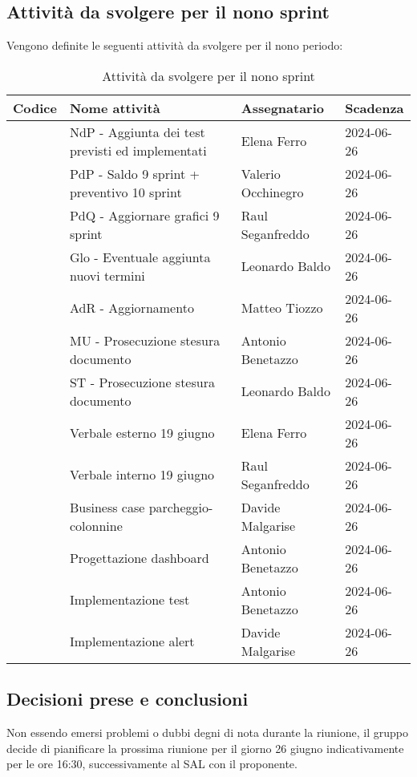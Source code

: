\documentclass[italian,12pt]{article}
\begin{document}
\subsection{Attività da svolgere per il nono sprint}
Vengono definite le seguenti attività da svolgere per il nono periodo:
\begin{table}[!h]
	\centering
	\begin{tabular}{ |l||p{7cm}|l|l| }
		\hline
		\textbf{Codice}          & \textbf{Nome attività}                           & \textbf{Assegnatario} & \textbf{Scadenza} \\
		\hline
		\mySkip[86bz8e28m]       & NdP - Aggiunta dei test previsti ed implementati & Elena Ferro           & 2024-06-26        \\
		\mySkip[86bz8e6cp]       & PdP - Saldo 9 sprint + preventivo 10 sprint      & Valerio Occhinegro    & 2024-06-26        \\
		\mySkip[86bz8e4ac]       & PdQ - Aggiornare grafici 9 sprint                & Raul Seganfreddo      & 2024-06-26        \\
		\mySkip[86bz8e8g5]       & Glo - Eventuale aggiunta nuovi termini           & Leonardo Baldo        & 2024-06-26        \\
		\mySkip[86bz8e13d]       & AdR - Aggiornamento                              & Matteo Tiozzo         & 2024-06-26        \\
		\mySkip[86bz8e2ja]       & MU - Prosecuzione stesura documento              & Antonio Benetazzo     & 2024-06-26        \\
		\mySkip[86bz8e3xn]       & ST - Prosecuzione stesura documento              & Leonardo Baldo        & 2024-06-26        \\
		\mySkip[86bz9gj8r]       & Verbale esterno 19 giugno                        & Elena Ferro           & 2024-06-26        \\
		\mySkip[86bz9gjd9]       & Verbale interno 19 giugno                        & Raul Seganfreddo      & 2024-06-26        \\
		\mySkip[86bz8dzy0]       & Business case parcheggio-colonnine               & Davide Malgarise      & 2024-06-26        \\
		\mySkip[86bz8dzz7]       & Progettazione dashboard                          & Antonio Benetazzo     & 2024-06-26        \\
		\mySkip[86bz8dzzg]       & Implementazione test                             & Antonio Benetazzo     & 2024-06-26        \\
		\mySkip[86bz8e010]       & Implementazione alert                            & Davide Malgarise      & 2024-06-26        \\
		\hline
	\end{tabular}
	\caption{Attività da svolgere per il nono sprint}
\end{table}

\subsection{Decisioni prese e conclusioni}
Non essendo emersi problemi o dubbi degni di nota durante la riunione, il gruppo decide di pianificare la prossima riunione per il giorno 26 giugno indicativamente per le ore 16:30, successivamente al SAL con il proponente.
\end{document}
